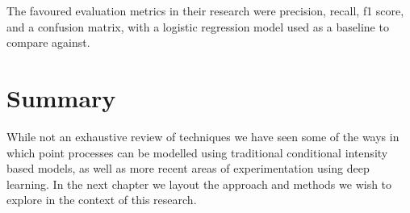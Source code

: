 The favoured evaluation metrics in their research were precision, recall, f1 score, and a confusion matrix, with a logistic regression model used as a baseline to compare against.

\section{Summary}

While not an exhaustive review of techniques we have seen some of the ways in which point processes can be modelled using traditional conditional intensity based models, as well as more recent areas of experimentation using deep learning. In the next chapter we layout the approach and methods we wish to explore in the context of this research.